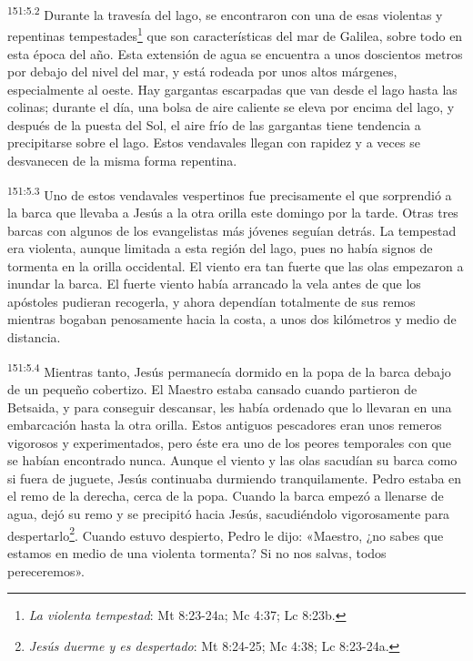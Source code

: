 \par 
\textsuperscript{151:5.2} Durante la travesía del lago, se encontraron con una de esas violentas y repentinas tempestades\footnote{\textit{La violenta tempestad}: Mt 8:23-24a; Mc 4:37; Lc 8:23b.} que son características del mar de Galilea, sobre todo en esta época del año. Esta extensión de agua se encuentra a unos doscientos metros por debajo del nivel del mar, y está rodeada por unos altos márgenes, especialmente al oeste. Hay gargantas escarpadas que van desde el lago hasta las colinas; durante el día, una bolsa de aire caliente se eleva por encima del lago, y después de la puesta del Sol, el aire frío de las gargantas tiene tendencia a precipitarse sobre el lago. Estos vendavales llegan con rapidez y a veces se desvanecen de la misma forma repentina.

\par 
\textsuperscript{151:5.3} Uno de estos vendavales vespertinos fue precisamente el que sorprendió a la barca que llevaba a Jesús a la otra orilla este domingo por la tarde. Otras tres barcas con algunos de los evangelistas más jóvenes seguían detrás. La tempestad era violenta, aunque limitada a esta región del lago, pues no había signos de tormenta en la orilla occidental. El viento era tan fuerte que las olas empezaron a inundar la barca. El fuerte viento había arrancado la vela antes de que los apóstoles pudieran recogerla, y ahora dependían totalmente de sus remos mientras bogaban penosamente hacia la costa, a unos dos kilómetros y medio de distancia.

\par 
\textsuperscript{151:5.4} Mientras tanto, Jesús permanecía dormido en la popa de la barca debajo de un pequeño cobertizo. El Maestro estaba cansado cuando partieron de Betsaida, y para conseguir descansar, les había ordenado que lo llevaran en una embarcación hasta la otra orilla. Estos antiguos pescadores eran unos remeros vigorosos y experimentados, pero éste era uno de los peores temporales con que se habían encontrado nunca. Aunque el viento y las olas sacudían su barca como si fuera de juguete, Jesús continuaba durmiendo tranquilamente. Pedro estaba en el remo de la derecha, cerca de la popa. Cuando la barca empezó a llenarse de agua, dejó su remo y se precipitó hacia Jesús, sacudiéndolo vigorosamente para despertarlo\footnote{\textit{Jesús duerme y es despertado}: Mt 8:24-25; Mc 4:38; Lc 8:23-24a.}. Cuando estuvo despierto, Pedro le dijo: «Maestro, ¿no sabes que estamos en medio de una violenta tormenta? Si no nos salvas, todos pereceremos».

